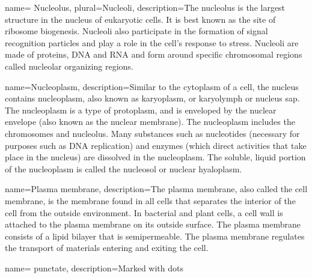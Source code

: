  {
	name= {Nucleolus},
	plural={Nucleoli},
	description={The nucleolus  is the largest structure in the nucleus of eukaryotic cells. It is best known as the site of ribosome biogenesis. Nucleoli also participate in the formation of signal recognition particles and play a role in the cell's response to stress. Nucleoli are made of proteins, DNA and RNA and form around specific chromosomal regions called nucleolar organizing regions. }}


 {
	name={Nucleoplasm},
	description={Similar to the cytoplasm of a cell, the nucleus contains nucleoplasm, also known as karyoplasm, or karyolymph or nucleus sap. The nucleoplasm is a type of protoplasm, and is enveloped by the nuclear envelope (also known as the nuclear membrane). The nucleoplasm includes the chromosomes and nucleolus. Many substances such as nucleotides (necessary for purposes such as DNA replication) and enzymes (which direct activities that take place in the nucleus) are dissolved in the nucleoplasm. The soluble, liquid portion of the nucleoplasm is called the nucleosol or nuclear hyaloplasm.}}


 {
	name={Plasma membrane},
	description={The plasma membrane, also called the cell membrane, is the membrane found in all cells that separates the interior of the cell from the outside environment. In bacterial and plant cells, a cell wall is attached to the plasma membrane on its outside surface. The plasma membrane consists of a lipid bilayer that is semipermeable. The plasma membrane regulates the transport of materials entering and exiting the cell.}}

 {
	name= {punctate},
	description={Marked with dots}}






